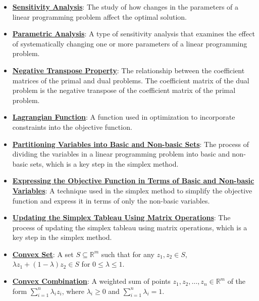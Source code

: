 \documentclass{article}%
\begin{document}
\begin{itemize}[leftmargin=*]
\item \href{https://www.math.purdue.edu/~yipn/421/2024-10-03-DualSimplexMatrix.pdf#page=1}{\textbf{Sensitivity Analysis}}: The study of how changes in the parameters of a linear programming problem affect the optimal solution. %
\item \href{https://www.math.purdue.edu/~yipn/421/2024-10-03-DualSimplexMatrix.pdf#page=1}{\textbf{Parametric Analysis}}: A type of sensitivity analysis that examines the effect of systematically changing one or more parameters of a linear programming problem. %
\item \href{https://www.math.purdue.edu/~yipn/421/2024-10-03-DualSimplexMatrix.pdf#page=2}{\textbf{Negative Transpose Property}}: The relationship between the coefficient matrices of the primal and dual problems. The coefficient matrix of the dual problem is the negative transpose of the coefficient matrix of the primal problem. %
\item \href{https://www.math.purdue.edu/~yipn/421/2024-10-03-DualSimplexMatrix.pdf#page=4}{\textbf{Lagrangian Function}}: A function used in optimization to incorporate constraints into the objective function. %
\item \href{https://www.math.purdue.edu/~yipn/421/2024-10-03-DualSimplexMatrix.pdf#page=7}{\textbf{Partitioning Variables into Basic and Non{-}basic Sets}}: The process of dividing the variables in a linear programming problem into basic and non-basic sets, which is a key step in the simplex method. %
\item \href{https://www.math.purdue.edu/~yipn/421/2024-10-03-DualSimplexMatrix.pdf#page=7}{\textbf{Expressing the Objective Function in Terms of Basic and Non{-}basic Variables}}: A technique used in the simplex method to simplify the objective function and express it in terms of only the non-basic variables. %
\item \href{https://www.math.purdue.edu/~yipn/421/2024-10-03-DualSimplexMatrix.pdf#page=11}{\textbf{Updating the Simplex Tableau Using Matrix Operations}}: The process of updating the simplex tableau using matrix operations, which is a key step in the simplex method. %
\item \href{https://www.math.purdue.edu/~yipn/421/2024-10-22-Convexity.pdf#page=1}{\textbf{Convex Set}}: A set $S \subseteq \mathbb{R}^m$ such that for any $z_1, z_2 \in S$, $\lambda z_1 + (1-\lambda) z_2 \in S$ for $0 \le \lambda \le 1$.%
\item \href{https://www.math.purdue.edu/~yipn/421/2024-10-22-Convexity.pdf#page=1}{\textbf{Convex Combination}}: A weighted sum of points $z_1, z_2, \dots, z_n \in \mathbb{R}^m$ of the form $\sum_{i=1}^n \lambda_i z_i$, where $\lambda_i \ge 0$ and $\sum_{i=1}^n \lambda_i = 1$.%

\end{itemize}
\end{document}
